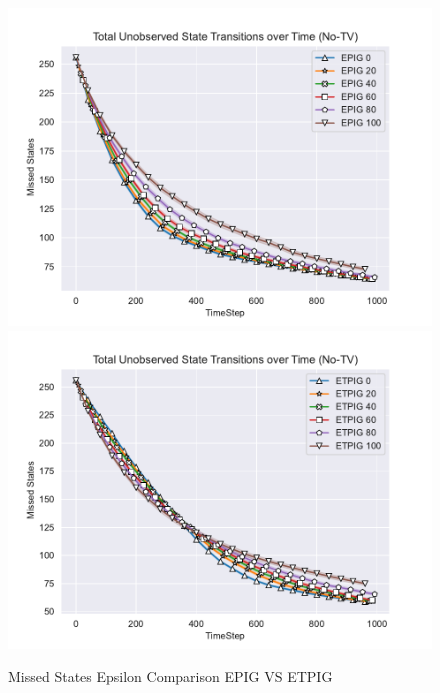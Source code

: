 \documentclass[12pt]{thesis}
\begin{document}
\begin{figure}[p]
	\includegraphics[scale=0.5]{"images/Epsilon_Missed_States_EPIG_No-TV.pdf"}
	\includegraphics[scale=0.5]{"images/Epsilon_Missed_States_ETPIG_No-TV.pdf"}
	\caption{Missed States Epsilon Comparison EPIG VS ETPIG}
	\label{Fig:EMEC}
	
\end{figure}
\end{document}
